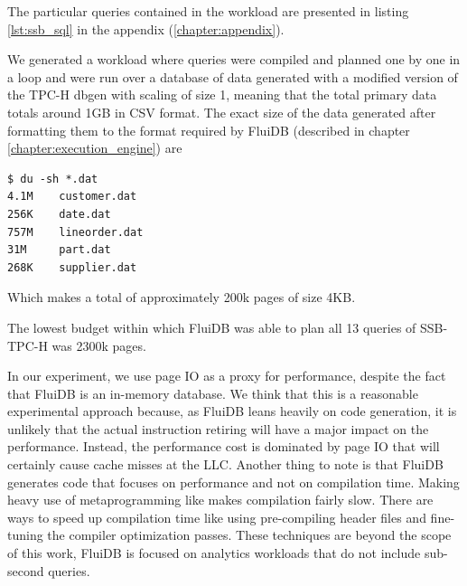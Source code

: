 The particular queries contained in the workload are presented in
listing \ref{lst:ssb_sql} in the appendix (\ref{chapter:appendix}).

We generated a workload where queries were compiled and planned one by
one in a loop and were run over a database of data generated with
a modified version of the TPC-H dbgen
\cite{perivolaropoulosFakedrakeSsbdbgen2021a} with scaling of size 1,
meaning that the total primary data totals around 1GB in CSV format. The
exact size of the data generated after formatting them to the format
required by FluiDB (described in chapter \ref{chapter:execution_engine}) are

\begin{verbatim}
$ du -sh *.dat
4.1M    customer.dat
256K    date.dat
757M    lineorder.dat
31M     part.dat
268K    supplier.dat
\end{verbatim}

Which makes a total of approximately 200k pages of size 4KB.

The lowest budget within which FluiDB was able to plan all 13 queries
of SSB-TPC-H was 2300k pages.

In our experiment, we use page IO as a proxy for performance, despite
the fact that FluiDB is an in-memory database. We think that this is a
reasonable experimental approach because, as FluiDB leans heavily on
code generation, it is unlikely that the actual instruction retiring
will have a major impact on the performance. Instead, the performance
cost is dominated by page IO that will certainly cause cache misses at
the LLC. Another thing to note is that FluiDB generates code that
focuses on performance and not on compilation time. Making heavy use
of metaprogramming like  makes compilation fairly
slow. There are ways to speed up compilation time like using
pre-compiling header files \cite{PrecompiledHeadersPCH} and
fine-tuning the compiler optimization passes. These techniques are
beyond the scope of this work, FluiDB is focused on analytics
workloads that do not include sub-second queries.

